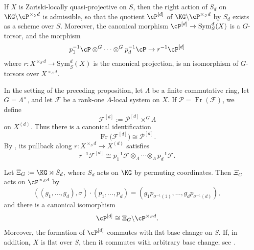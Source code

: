 \medskip

\begin{prop}\label{prop:symmetric_power_torsor}
If $X$ is Zariski-locally quasi-projective on $S$, then the right action of ${S}_d$ on $\KG \backslash \cP^{\times_S d}$ is admissible,
so that the quotient $\cP^{[d]}$ of $\KG \backslash \cP^{\times_S d}$ by ${S}_d$ exists as a scheme over $S$.
Moreover, the canonical morphism $\cP^{[d]} \to \mathrm{Sym}_S^d(X)$ is a $G$-torsor, 
and the morphism
\[
p_1^{-1}\cP \otimes^G \cdots \otimes^G p_d^{-1}\cP \to r^{-1}\cP^{[d]}
\]
where $r : X^{\times_S d} \to \mathrm{Sym}_S^d(X)$ is the canonical projection, is an isomorphism of $G$-torsors over $X^{\times_S d}$.
\end{prop}

\begin{definition}
\label{definition:symmetric_power_local_system}
In the setting of the preceding proposition, let $\Lambda$ be a finite
commutative ring, let $G=\Lambda^\times$, and let
$\mathcal{F}$ be a rank-one $\Lambda$-local system on $X$. If
$\mathcal{P}=\operatorname{Fr}(\mathcal{F})$, we define
\[
\mathcal{F}^{[d]}:=\mathcal{P}^{[d]}\times^G\Lambda
\]
on $X^{(d)}$. Thus there is a canonical identification
\[
\operatorname{Fr}\bigl(\mathcal{F}^{[d]}\bigr)
\cong \mathcal{P}^{[d]}.
\]
By , its pullback along
$r:X^{\times_S d}\to X^{(d)}$ satisfies
\[
r^{-1}\mathcal{F}^{[d]}
\cong p_1^{-1}\mathcal{F}\otimes_\Lambda\cdots\otimes_\Lambda
p_d^{-1}\mathcal{F}.
\]
\end{definition}


\begin{prop}
\label{prop:symmetric_power_semidirect_quotient}
Let $\Xi_G:=\KG\rtimes S_d$, where $S_d$ acts on $\KG$ by permuting
coordinates. Then $\Xi_G$ acts on $\cP^{\times_S d}$ by
\[
((g_1,\ldots,g_d),\sigma)\cdot(p_1,\ldots,p_d)
=
(g_1p_{\sigma^{-1}(1)},\ldots,g_dp_{\sigma^{-1}(d)}),
\]
and there is a canonical isomorphism
\[
\cP^{[d]}
\cong
\Xi_G\backslash\cP^{\times_S d}.
\]
Moreover, the formation of $\cP^{[d]}$ commutes with flat base change on
$S$. If, in addition, $X$ is flat over $S$, then it commutes with arbitrary
base change; see \cite[Proposition~2.33]{Guignard2018}.
\end{prop}


